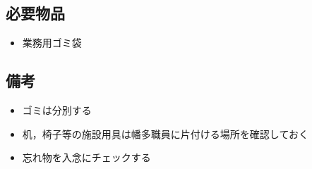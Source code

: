 
\subsection{必要物品}
\begin{itemize}
\item 業務用ゴミ袋
\end{itemize}


\subsection{備考}
\begin{itemize}
\item ゴミは分別する
\item 机，椅子等の施設用具は幡多職員に片付ける場所を確認しておく
\item 忘れ物を入念にチェックする
\end{itemize}


%

